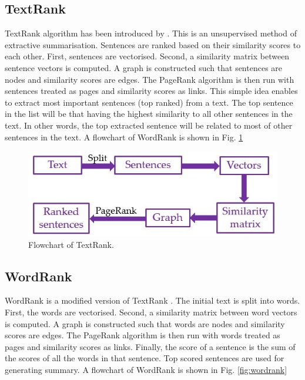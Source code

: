 \documentclass[11pt]{article}
\begin{document}
\subsection{TextRank}
\label{subsect:textrank}

TextRank algorithm has been introduced by \citet{mihalcea2004textrank}. This is an unsupervised method of extractive summarisation. Sentences are ranked based on their similarity scores to each other. First, sentences are vectorised. Second, a similarity matrix between sentence vectors is computed. A graph is constructed such that sentences are nodes and similarity scores are edges. The PageRank algorithm is then run with sentences treated as pages and similarity scores as links. This simple idea enables to extract most important sentences (top ranked) from a text. The top sentence in the list will be that having the highest similarity to all other sentences in the text. In other words, the top extracted sentence will be related to most of other sentences in the text. A flowchart of WordRank is shown in Fig. \ref{fig:textrank}

\begin{figure}[!h]
\centering
\includegraphics[scale = 0.5]{../figures/textrank.jpg}
\caption{Flowchart of TextRank.\label{fig:textrank}}
\end{figure}

\subsection{WordRank}
\label{subsect:wordrank}

WordRank is a modified version of TextRank \citep{reza2020}. The initial text is split into words. First, the words are vectorised. Second, a similarity matrix between word vectors is computed. A graph is constructed such that words are nodes and similarity scores are edges. The PageRank algorithm is then run with words treated as pages and similarity scores as links. Finally, the score of a sentence is the sum of the scores of all the words in that sentence. Top scored sentences are used for generating summary. A flowchart of WordRank is shown in Fig. \ref{fig:wordrank}
\end{document}
